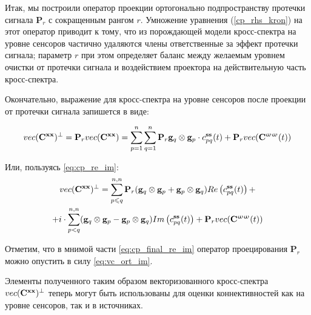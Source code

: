 Итак, мы построили оператор проекции ортогонально подпространству протечки сигнала $\mathbf{P}_r$
с сокращенным рангом $r$.
Умножение уравнения (\ref{cp_rhs_kron}) на этот оператор приводит к тому, что  из порождающей
модели кросс-спектра на уровне сенсоров частично удаляются члены ответственные за эффект протечки сигнала;
параметр $r$ при этом определяет баланс между желаемым уровнем очистки от протечки сигнала и
воздействием проектора на действительную часть кросс-спектра.

Окончательно, выражение для кросс-спектра на уровне сенсоров после проекции от протечки сигнала
запишется в виде:

\begin{equation}
    vec(\mathbf{C}^{\mathbf{x x}})^\perp = \mathbf{P}_r vec(\mathbf{C}^{\mathbf{x x}}) =
    \sum\limits_{p=1}^n\sum\limits_{q=1}^n \mathbf{P}_r \mathbf{g}_q\otimes
    \mathbf{g}_p \cdot c_{pq}^{\mathbf{ss}}(t) + \mathbf{P}_r vec(\mathbf{C}^{\mathbf{\upomega \upomega}}(t))
    \label{eq:cp_final}
\end{equation}

Или, пользуясь \ref{eq:cp_re_im}:
\begin{multline}
    vec(\mathbf{C}^{\mathbf{x x}})^\perp = \sum\limits_{p\leqslant q}^{n,n}
    \mathbf{P}_r(\mathbf{g}_q\otimes \mathbf{g}_p + \mathbf{g}_p\otimes \mathbf{g}_q)
           Re\left(c_{pq}^{\mathbf{ss}}(t)\right) + \\
    + i \cdot \sum\limits_{p<q}^{n,n} (\mathbf{g}_q\otimes \mathbf{g}_p - \mathbf{g}_p\otimes \mathbf{g}_q)
           Im\left(c_{pq}^{\mathbf{ss}}(t)\right) +
           \mathbf{P}_r vec(\mathbf{C}^{\mathbf{\upomega \upomega}}(t))
    \label{eq:cp_final_re_im}
\end{multline}

Отметим, что в мнимой части \ref{eq:cp_final_re_im} оператор проецирования $\mathbf{P}_r$ можно опустить
в силу \ref{eq:vc_ort_im}.

Элементы полученного таким образом векторизованного кросс-спектра $vec(\mathbf{C}^{\mathbf{x x}})^\perp$ теперь могут быть
использованы для оценки коннективностей как на уровне сенсоров, так и в источниках.

